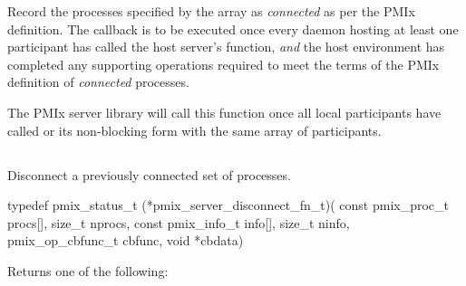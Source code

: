 \optattrend

\descr

Record the processes specified by the  array as \textit{connected} as per the \ac{PMIx} definition. The callback is to be executed once every daemon hosting at least one participant has called the host server's  function, \textit{and} the host environment has completed any supporting operations required to meet the terms of the \ac{PMIx} definition of \textit{connected} processes.

\advicermstart
The \ac{PMIx} server library will
call this function once all local participants have called  or its non-blocking form with the same array of participants.
\advicermend

\subsection{}

\summary

Disconnect a previously connected set of processes.

\format

\cspecificstart
\begin{codepar}
typedef pmix_status_t (*pmix_server_disconnect_fn_t)(
                             const pmix_proc_t procs[],
                             size_t nprocs,
                             const pmix_info_t info[],
                             size_t ninfo,
                             pmix_op_cbfunc_t cbfunc,
                             void *cbdata)
\end{codepar}
\cspecificend

\begin{arglist}
\end{arglist}

Returns one of the following:

